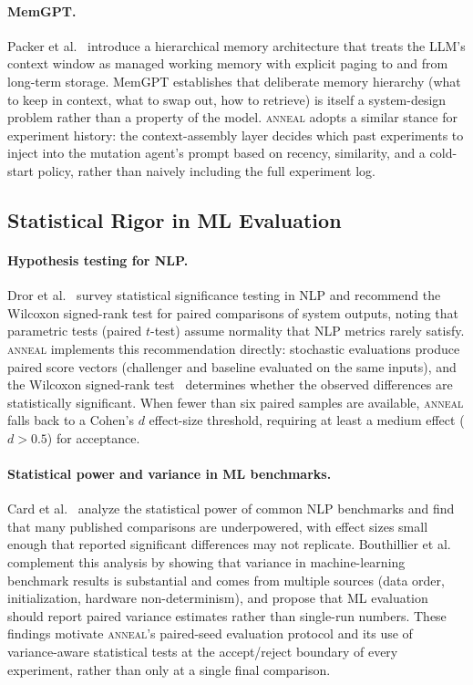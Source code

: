 \paragraph{MemGPT.}
Packer et al.~\cite{packer2023memgpt} introduce a hierarchical memory architecture that treats the LLM's context window as managed working memory with explicit paging to and from long-term storage.
MemGPT establishes that deliberate memory hierarchy (what to keep in context, what to swap out, how to retrieve) is itself a system-design problem rather than a property of the model.
\textsc{anneal} adopts a similar stance for experiment history: the context-assembly layer decides which past experiments to inject into the mutation agent's prompt based on recency, similarity, and a cold-start policy, rather than naively including the full experiment log.

\subsection{Statistical Rigor in ML Evaluation}

\paragraph{Hypothesis testing for NLP.}
Dror et al.~\cite{dror2018hitchhiker} survey statistical significance testing in NLP and recommend the Wilcoxon signed-rank test for paired comparisons of system outputs, noting that parametric tests (paired $t$-test) assume normality that NLP metrics rarely satisfy.
\textsc{anneal} implements this recommendation directly: stochastic evaluations produce paired score vectors (challenger and baseline evaluated on the same inputs), and the Wilcoxon signed-rank test~\cite{wilcoxon1945individual} determines whether the observed differences are statistically significant.
When fewer than six paired samples are available, \textsc{anneal} falls back to a Cohen's $d$ effect-size threshold, requiring at least a medium effect ($d > 0.5$) for acceptance.

\paragraph{Statistical power and variance in ML benchmarks.}
Card et al.~\cite{card2020power} analyze the statistical power of common NLP benchmarks and find that many published comparisons are underpowered, with effect sizes small enough that reported significant differences may not replicate.
Bouthillier et al.~\cite{bouthillier2021variance} complement this analysis by showing that variance in machine-learning benchmark results is substantial and comes from multiple sources (data order, initialization, hardware non-determinism), and propose that ML evaluation should report paired variance estimates rather than single-run numbers.
These findings motivate \textsc{anneal}'s paired-seed evaluation protocol and its use of variance-aware statistical tests at the accept/reject boundary of every experiment, rather than only at a single final comparison.

